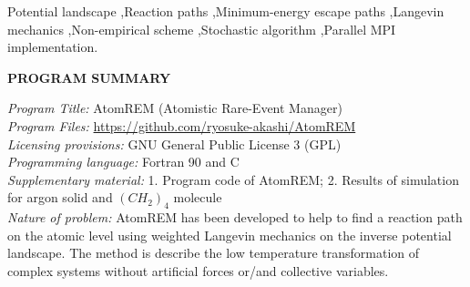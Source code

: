 \documentclass[preprint,12pt]{elsarticle}
\begin{document}
\begin{frontmatter}
\begin{keyword}
 Potential landscape \sep Reaction paths \sep Minimum-energy escape paths \sep Langevin mechanics \sep Non-empirical scheme  \sep Stochastic algorithm \sep Parallel MPI implementation.
\end{keyword}

\end{frontmatter}


{\bf PROGRAM SUMMARY}

\begin{small}
\noindent
{\em Program Title:}   AtomREM (Atomistic Rare-Event Manager)                                         \\
{\em Program Files:}   \href{https://github.com/ryosuke-akashi/AtomREM}{https://github.com/ryosuke-akashi/AtomREM}                                         \\
{\em Licensing provisions: }  GNU General Public License 3 (GPL)                   \\
{\em Programming language:}    Fortran 90 and C                \\
\noindent
{\em Supplementary material:}     1. Program code of AtomREM; 2. Results of simulation for argon solid and $(CH_2)_4$ molecule                                \\
\noindent
{\em Nature of problem:} 
AtomREM has been developed to help to find a reaction path on the atomic level using weighted Langevin mechanics on the inverse potential landscape. 
The method is describe the low temperature transformation of complex systems without artificial forces or/and collective variables. 


\end{small}
\end{document}
